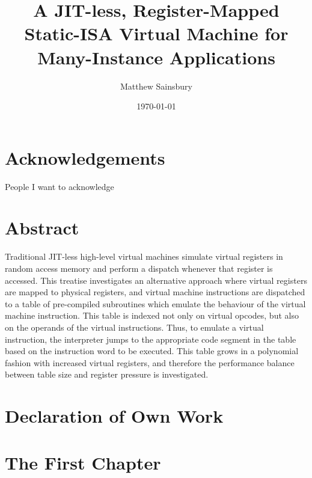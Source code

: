 



\title{A JIT-less, Register-Mapped Static-ISA Virtual Machine for Many-Instance Applications}
\author{Matthew Sainsbury}
\date{\today}

\begin{titlepage}
	\maketitle
\end{titlepage}


\chapter*{Acknowledgements}
People I want to acknowledge

\chapter*{Abstract}
Traditional JIT-less high-level virtual machines simulate virtual registers in random access memory and perform a dispatch whenever that register is accessed. This treatise investigates an alternative approach where virtual registers are mapped to physical registers, and virtual machine instructions are dispatched to a table of pre-compiled subroutines which emulate the behaviour of the virtual machine instruction. This table is indexed not only on virtual opcodes, but also on the operands of the virtual instructions. Thus, to emulate a virtual instruction, the interpreter jumps to the appropriate code segment in the table based on the instruction word to be executed. This table grows in a polynomial fashion with increased virtual registers, and therefore the performance balance between table size and register pressure is investigated.

\chapter*{Declaration of Own Work}

\tableofcontents



\chapter{The First Chapter}
	\startrealnumbers
	
